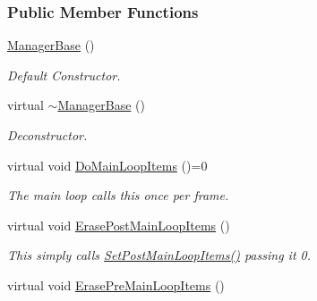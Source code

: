 \subsubsection*{Public Member Functions}
\begin{DoxyCompactItemize}
\item 
\hypertarget{classMezzanine_1_1ManagerBase_a6ee3249f71f330394e81e349370d57a8}{
\hyperlink{classMezzanine_1_1ManagerBase_a6ee3249f71f330394e81e349370d57a8}{ManagerBase} ()}
\label{classMezzanine_1_1ManagerBase_a6ee3249f71f330394e81e349370d57a8}

\begin{DoxyCompactList}\small\item\em Default Constructor. \item\end{DoxyCompactList}\item 
virtual \hyperlink{classMezzanine_1_1ManagerBase_a04cb832dc79f4559cc5b2f57cabfa70d}{$\sim$ManagerBase} ()
\begin{DoxyCompactList}\small\item\em Deconstructor. \item\end{DoxyCompactList}\item 
virtual void \hyperlink{classMezzanine_1_1ManagerBase_a4ee29e4baf6c4b9a3bfec1b2258d5cd2}{DoMainLoopItems} ()=0
\begin{DoxyCompactList}\small\item\em The main loop calls this once per frame. \item\end{DoxyCompactList}\item 
\hypertarget{classMezzanine_1_1ManagerBase_acff151003c2370c857dadb67148faffc}{
virtual void \hyperlink{classMezzanine_1_1ManagerBase_acff151003c2370c857dadb67148faffc}{ErasePostMainLoopItems} ()}
\label{classMezzanine_1_1ManagerBase_acff151003c2370c857dadb67148faffc}

\begin{DoxyCompactList}\small\item\em This simply calls \hyperlink{classMezzanine_1_1ManagerBase_a4ec52058f4c8a3f1c5fb20230b4fc301}{SetPostMainLoopItems()} passing it 0. \item\end{DoxyCompactList}\item 
\hypertarget{classMezzanine_1_1ManagerBase_a1f1b8b02c34ccfd72040a7183fc3cba1}{
virtual void \hyperlink{classMezzanine_1_1ManagerBase_a1f1b8b02c34ccfd72040a7183fc3cba1}{ErasePreMainLoopItems} ()}
\label{classMezzanine_1_1ManagerBase_a1f1b8b02c34ccfd72040a7183fc3cba1}


\end{DoxyCompactItemize}
